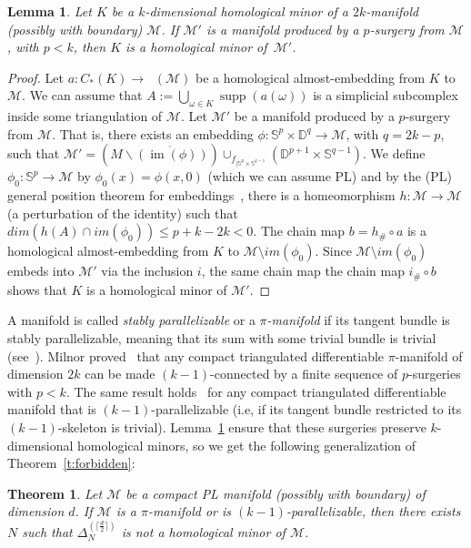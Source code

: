 \documentclass[a4paper,UKenglish,thm-restate]{article}
\newcommand{\M}{\mathcal{M}}
\DeclareMathOperator{\supp}{supp}
\DeclareMathOperator{\Csing}{C_*^{sing}}
\DeclareMathOperator{\im}{im}
\newcommand{\pth}[1]{\left(#1\right)}
\newtheorem{theorem}{Theorem}
\newtheorem{lemma}{Lemma}[section]
\begin{document}
\begin{lemma}\label{l:surgery-stability-minors}
  Let $K$ be a $k$-dimensional homological minor of a $2k$-manifold (possibly with boundary) $\M$. If $\M'$ is a manifold produced by a $p$-surgery from $\M$,
  with $p < k$, then $K$ is a homological minor of~$\M'$.
\end{lemma}
\begin{proof}
  Let $a:C_*(K)\to \Csing(\M)$ be a homological almost-embedding from $K$ to $\M$. We can assume that $A:=\bigcup_{\omega\in K}\supp(a(\omega))$ is a simplicial subcomplex inside some triangulation of $\M$. Let $\M'$ be a manifold produced by a $p$-surgery from $\M$. That is, there exists an embedding $\phi:\mathbb{S}^p\times\mathbb{D}^q\to \M$, with  $q = 2k-p$, such that $\M'= \pth{M\backslash \mathring{\pth{\im(\phi)}}}\cup_{f_{|\mathbb{S}^p\times\mathbb{S}^{q-1}}}\pth{\mathbb{D}^{p+1}\times\mathbb{S}^{q-1}}$. We define $\phi_0:\mathbb{S}^p\to\M$ by $\phi_0(x)=\phi(x,0)$ (which we can assume PL) and by the (PL) general position theorem for embeddings~\cite[$\S$5.3]{Rourke1972IntroductionTP}, there is a homeomorphism $h:\M\to\M$ (a perturbation of the identity) such that $dim\pth{h( A)\cap im(\phi_0)}\leq p+k-2k<0$. The chain map $b=h_{\#}\circ a$ is a homological almost-embedding from $K$ to $\M\setminus im(\phi_0)$. Since $\M\setminus im(\phi_0)$ embeds into $\M'$ via the inclusion $i$, the same chain map the chain map $i_\#\circ b$ shows that $K$ is a homological minor of $\M'$.
\end{proof}

A manifold is called \emph{stably parallelizable} or a \emph{$\pi$-manifold} if its tangent bundle is stably parallelizable, meaning that its sum with some trivial bundle is trivial (see~\cite{milnor}). Milnor proved~\cite[Corollary to Theorem~$2$]{milnor} that any compact triangulated differentiable $\pi$-manifold of dimension $2k$ can be made $(k-1)$-connected by a finite sequence of $p$-surgeries with $p<k$. The same result holds~\cite[Corollary to Theorem~$3$]{milnor} for any compact triangulated differentiable manifold that is $(k-1)$-parallelizable (i.e, if its tangent bundle restricted to its $(k-1)$-skeleton is trivial). Lemma~\ref{l:surgery-stability-minors} ensure that these surgeries preserve $k$-dimensional homological minors, so we get the following generalization of Theorem~\ref{t:forbidden}:

\begin{theorem}\label{t:pi-manifold}
  Let $\M$ be a compact PL manifold (possibly with boundary) of dimension $d$. If $\M$ is a $\pi$-manifold or is $(k-1)$-parallelizable, then there exists $N$ such that $\Delta_N^{\pth{\lceil \frac{d}2\rceil}}$ is not a homological minor of $\M$.
\end{theorem}
\end{document}
